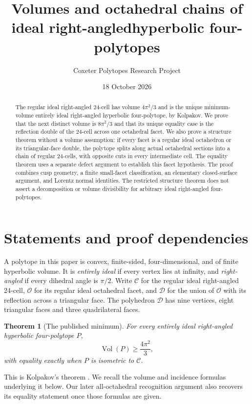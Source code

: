 \documentclass[11pt]{article}
\title{Volumes and octahedral chains of ideal right-angled\linebreak hyperbolic four-polytopes}
\author{Coxeter Polytopes Research Project}
\date{18 October 2026}
\newtheorem{theorem}{Theorem}[section]
\theoremstyle{remark}
\newcommand{\Vol}{\operatorname{Vol}}
\newcommand{\OCT}{\mathcal O}
\newcommand{\DBL}{\mathcal D}
\newcommand{\CELL}{\mathcal C}
\begin{document}
\maketitle
\begin{abstract}
The regular ideal right-angled 24-cell has volume $4\pi^2/3$ and is the
unique minimum-volume entirely ideal right-angled hyperbolic
four-polytope, by Kolpakov. We prove that the next distinct volume is
$8\pi^2/3$ and that its unique equality case is the reflection double
of the 24-cell across one octahedral facet. We also prove a structure
theorem without a volume assumption: if every facet is a regular
ideal octahedron or its triangular-face double, the polytope splits
along actual octahedral sections into a chain of regular 24-cells,
with opposite cuts in every intermediate cell. The equality theorem
uses a separate defect argument to establish this facet hypothesis.
The proof combines cusp geometry, a finite small-facet classification,
an elementary closed-surface argument, and Lorentz normal identities.
The restricted structure theorem does not assert a decomposition or
volume divisibility for arbitrary ideal right-angled four-polytopes.
\end{abstract}

\section{Statements and proof dependencies}
A polytope in this paper is convex, finite-sided, four-dimensional,
and of finite hyperbolic volume. It is \emph{entirely ideal} if every
vertex lies at infinity, and \emph{right-angled} if every dihedral
angle is $\pi/2$. Write $\CELL$ for the regular ideal right-angled
24-cell, $\OCT$ for its regular ideal octahedral facet, and $\DBL$
for the union of $\OCT$ with its reflection across a triangular
face. The polyhedron $\DBL$ has nine vertices, eight triangular
faces and three quadrilateral faces.

\begin{theorem}[The published minimum]\label{thm:minimum}
For every entirely ideal right-angled hyperbolic four-polytope $P$,
\[
 \Vol(P)\ge\frac{4\pi^2}{3},
\]
with equality exactly when $P$ is isometric to $\CELL$.
\end{theorem}
This is Kolpakov's theorem \cite[Theorem~3]{Kolpakov}. We recall the
volume and incidence formulas underlying it below. Our later
all-octahedral recognition argument also recovers its equality
statement once those formulas are given.
\end{document}
